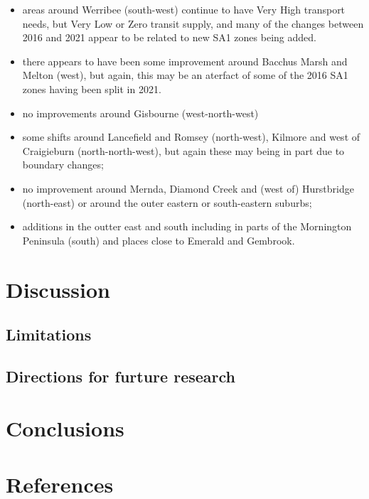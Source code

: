 \documentclass[preprint, 3p,
authoryear]{elsarticle} %
\providecommand{\tightlist}{%
  \setlength{\itemsep}{0pt}\setlength{\parskip}{0pt}}
\begin{document}
\begin{itemize}
\tightlist
\item
  areas around Werribee (south-west) continue to have Very High
  transport needs, but Very Low or Zero transit supply, and many of the
  changes between 2016 and 2021 appear to be related to new SA1 zones
  being added.
\item
  there appears to have been some improvement around Bacchus Marsh and
  Melton (west), but again, this may be an aterfact of some of the 2016
  SA1 zones having been split in 2021.\\
\item
  no improvements around Gisbourne (west-north-west)
\item
  some shifts around Lancefield and Romsey (north-west), Kilmore and
  west of Craigieburn (north-north-west), but again these may being in
  part due to boundary changes;
\item
  no improvement around Mernda, Diamond Creek and (west of) Hurstbridge
  (north-east) or around the outer eastern or south-eastern suburbs;
\item
  additions in the outter east and south including in parts of the
  Mornington Peninsula (south) and places close to Emerald and Gembrook.
\end{itemize}

\hypertarget{discussion}{%
\section{Discussion}\label{discussion}}

\hypertarget{limitations}{%
\subsection{Limitations}\label{limitations}}

\hypertarget{directions-for-furture-research}{%
\subsection{Directions for furture
research}\label{directions-for-furture-research}}

\hypertarget{conclusions}{%
\section{Conclusions}\label{conclusions}}

\hypertarget{references}{%
\section*{References}\label{references}}
\end{document}
